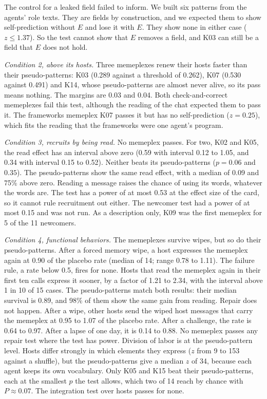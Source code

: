 The control for a leaked field failed to inform. We built six patterns from the agents' role texts. They are fields by construction, and we expected them to show self-prediction without $E$ and lose it with $E$. They show none in either case ($z \le 1.37$). So the test cannot show that $E$ removes a field, and K03 can still be a field that $E$ does not hold.

\emph{Condition 2, above its hosts.} Three memeplexes renew their hosts faster than their pseudo-patterns: K03 (0.289 against a threshold of 0.262), K07 (0.530 against 0.491) and K14, whose pseudo-patterns are almost never alive, so its pass means nothing. The margins are 0.03 and 0.04. Both check-and-correct memeplexes fail this test, although the reading of the chat expected them to pass it. The frameworks memeplex K07 passes it but has no self-prediction ($z = 0.25$), which fits the reading that the frameworks were one agent's program.

\emph{Condition 3, recruits by being read.} No memeplex passes. For two, K02 and K05, the read effect has an interval above zero (0.59 with interval 0.12 to 1.05, and 0.34 with interval 0.15 to 0.52). Neither beats its pseudo-patterns ($p = 0.06$ and $0.35$). The pseudo-patterns show the same read effect, with a median of 0.09 and 75\% above zero. Reading a message raises the chance of using its words, whatever the words are. The test has a power of at most 0.53 at the effect size of the card, so it cannot rule recruitment out either. The newcomer test had a power of at most 0.15 and was not run. As a description only, K09 was the first memeplex for 5 of the 11 newcomers.

\emph{Condition 4, functional behaviors.} The memeplexes survive wipes, but so do their pseudo-patterns. After a forced memory wipe, a host expresses the memeplex again at 0.90 of the placebo rate (median of 14; range 0.78 to 1.11). The failure rule, a rate below 0.5, fires for none. Hosts that read the memeplex again in their first ten calls express it sooner, by a factor of 1.21 to 2.34, with the interval above 1 in 10 of 15 cases. The pseudo-patterns match both results: their median survival is 0.89, and 98\% of them show the same gain from reading. Repair does not happen. After a wipe, other hosts send the wiped host messages that carry the memeplex at 0.95 to 1.07 of the placebo rate. After a challenge, the rate is 0.64 to 0.97. After a lapse of one day, it is 0.14 to 0.88. No memeplex passes any repair test where the test has power. Division of labor is at the pseudo-pattern level. Hosts differ strongly in which elements they express ($z$ from 9 to 153 against a shuffle), but the pseudo-patterns give a median $z$ of 34, because each agent keeps its own vocabulary. Only K05 and K15 beat their pseudo-patterns, each at the smallest $p$ the test allows, which two of 14 reach by chance with $P \approx 0.07$. The integration test over hosts passes for none.

